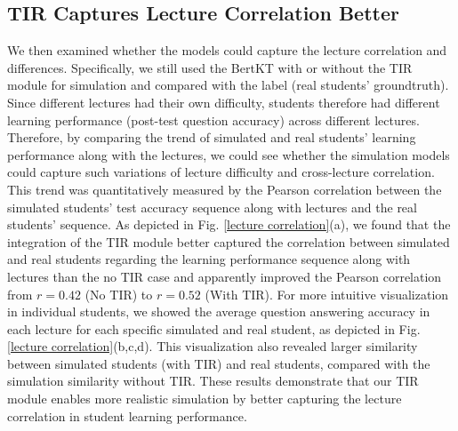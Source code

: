 \subsection{TIR Captures Lecture Correlation Better}




We then examined whether the models could capture the lecture correlation and differences. Specifically, we still used the BertKT with or without the TIR module  for simulation and compared with the 
label (real students' groundtruth). Since different lectures had their own difficulty, students therefore had different learning performance (post-test question accuracy) across different lectures. Therefore, by comparing the trend of simulated and real students' learning performance along with the lectures, we could see whether the simulation models could capture such variations of lecture difficulty and cross-lecture correlation. 
%
This trend was quantitatively measured by the Pearson correlation between the simulated students'  test accuracy sequence along with lectures and the real students' sequence.    
As depicted in Fig. \ref{lecture correlation}(a), we found that the integration of the TIR module better captured the correlation between simulated and real students regarding the learning performance sequence along with lectures than the no TIR case and apparently improved the Pearson correlation from $r=0.42$ (No TIR) to $r=0.52$ (With TIR).
For more intuitive visualization in individual students, we showed the average question answering accuracy in each lecture for each specific simulated and real student, as depicted in Fig. \ref{lecture correlation}(b,c,d). This visualization also revealed larger similarity between simulated students (with TIR) and real students, compared with the simulation similarity without TIR.
These results demonstrate that our TIR module enables more realistic simulation by better capturing the lecture correlation in student learning performance.


